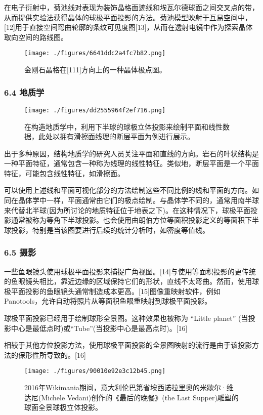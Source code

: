 在电子衍射中，菊池线对表现为装饰晶格面迹线和埃瓦尔德球面之间交叉点的带，从而提供实验法获得晶体的球极平面投影的方法。菊池模型映射于互易空间中，[12]用于直接空间弯曲轮廓的条纹可见度图[13]，从而在透射电镜中作为探索晶体取向空间的路线图。
\begin{figure}[ht]
\centering
\texttt{[image: ./figures/6641ddc2a4fc7b82.png]}
\caption{金刚石晶格在[111]方向上的一种晶体极点图。} \label{fig_QJPMTY_24}
\end{figure}
\subsubsection{6.4 地质学}
\begin{figure}[ht]
\centering
\texttt{[image: ./figures/dd2555964f2ef716.png]}
\caption{在构造地质学中，利用下半球的球极立体投影来绘制平面和线性数据，此处以拥有滑擦面线理的断层平面为例进行展示。} \label{fig_QJPMTY_25}
\end{figure}
出于多种原因，结构地质学的研究人员关注平面和直线的方向。岩石的叶状结构是一种平面特征，通常包含一种称为线理的线性特征。类似地，断层平面是一个平面特征，可能包含线性特征，如滑擦面。

可以使用上述线和平面可视化部分的方法绘制这些不同比例的线和平面的方向。如同在晶体学中一样，平面通常由它们的极点绘制。与晶体学不同的，通常用南半球来代替北半球(因为所讨论的地质特征位于地表之下)。在这种情况下，球极平面投影通常被称为等角下半球投影。也会使用由朗伯方位等面积投影定义的等面积下半球投影，特别是当该图要进行后续的统计分析时，如密度等值线。
\subsubsection{6.5 摄影}
一些鱼眼镜头使用球极平面投影来捕捉广角视图。[14]与使用等面积投影的更传统的鱼眼镜头相比，靠近边缘的区域保持它们的形状，直线不太弯曲。然而，使用球极平面投影的鱼眼镜头通常制造成本更高。[15]图像重映射软件，例如 Panotools，允许自动将照片从等面积鱼眼重映射到球极平面投影。

球极平面投影已经用于绘制球形全景图。这种效果也被称为 “Little planet” (当投影中心是最低点时)或“Tube”(当投影中心是最高点时)。[16]

相较于其他方位投影方法，使用球极平面投影的全景图映射的流行是由于该投影方法的保形性所导致的。[16]
\begin{figure}[ht]
\centering
\texttt{[image: ./figures/90010e92e3c12b45.png]}
\caption{2016年Wikimania期间，意大利伦巴第省埃西诺拉里奥的米歇尔·维达尼(Michele Vedani)创作的《最后的晚餐》(the Last Supper)雕塑的球面全景球极立体投影。} \label{fig_QJPMTY_26}
\end{figure}

